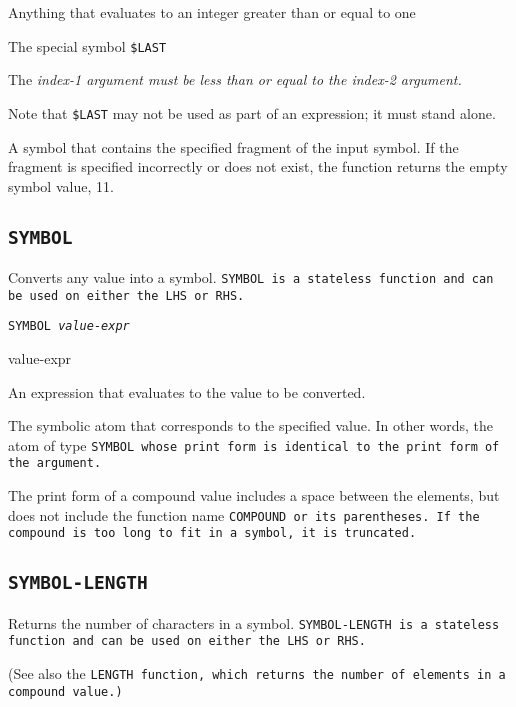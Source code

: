 {{\begin{arguments}
  Anything that evaluates to an integer greater than or equal to one

  The special symbol \verb|$LAST|

  The \it{index-1} argument must be less than or equal to the
  \it{index-2} argument.
\end{arguments}

Note that \verb|$LAST| may not be used as part of an expression; it
must stand alone.

\ReturnValue

A symbol that contains the specified fragment of the input symbol. If
the fragment is specified incorrectly or does not exist, the function
returns the empty symbol value, 11.

\subsection{\tt{SYMBOL}}

Converts any value into a symbol. \tt{SYMBOL} is a stateless function
and can be used on either the LHS or RHS.

\Format

\tt{SYMBOL} \it{value-expr}

\begin{arguments}
\item[value-expr]

  An expression that evaluates to the value to be converted.
\end{arguments}

\ReturnValue

The symbolic atom that corresponds to the specified value. In other
words, the atom of type \tt{SYMBOL} whose print form is identical to
the print form of the argument.

The print form of a compound value includes a space between the
elements, but does not include the function name \tt{COMPOUND} or its
parentheses. If the compound is too long to fit in a symbol, it is
truncated.

\subsection{\tt{SYMBOL-LENGTH}}

Returns the number of characters in a symbol. \tt{SYMBOL-LENGTH} is a
stateless function and can be used on either the LHS or RHS.

(See also the \tt{LENGTH} function, which returns the number of
elements in a compound value.)

}}
